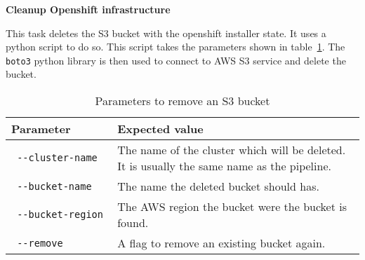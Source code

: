 \textbf{Cleanup Openshift infrastructure}

This task deletes the S3 bucket with the openshift installer state.
It uses a python script to do so.
This script takes the parameters shown in table~\ref{tab:params-remove-s3-bucket}.
The \verb|boto3| python library is then used to connect to AWS S3 service and delete the bucket.

\begin{table}[H]
    \centering
    \caption{Parameters to remove an S3 bucket}
    \label{tab:params-remove-s3-bucket}
    \begin{tabular}{p{0.3\linewidth}|p{0.7\linewidth}}
        Parameter & Expected value \\
        \hline
        \verb| --cluster-name | & The name of the cluster which will be deleted.
            It is usually the same name as the pipeline. \\
        \verb| --bucket-name | & The name the deleted bucket should has. \\
        \verb| --bucket-region | & The AWS region the bucket were the bucket is found. \\
        \verb| --remove | & A flag to remove an existing bucket again. \\
    \end{tabular}
\end{table}

